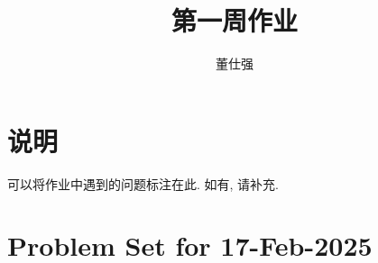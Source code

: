 \documentclass[11pt]{ctexart}
\title{第一周作业}
\author{董仕强}
\theoremstyle{definition}
\numberwithin{equation}{section}
\theoremstyle{definition}
\theoremstyle{remark}
\begin{document}
\maketitle

\section{说明}

可以将作业中遇到的问题标注在此. 如有, 请补充.

\tableofcontents

\newpage


\section{Problem Set for 17-Feb-2025}
\end{document}
